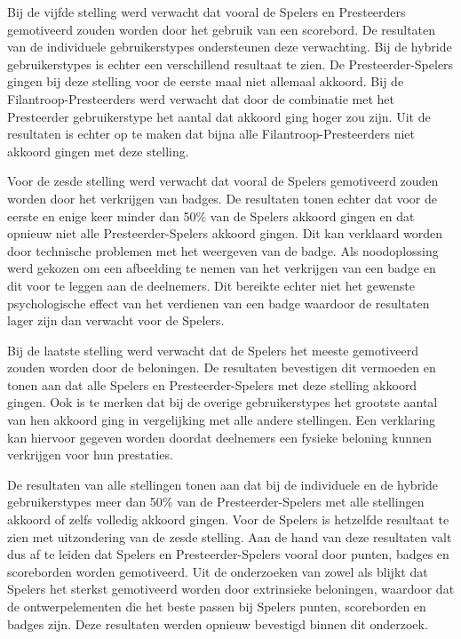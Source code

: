Bij de vijfde stelling werd verwacht dat vooral de Spelers en Presteerders gemotiveerd zouden worden door het gebruik van een scorebord. De resultaten van de individuele gebruikerstypes ondersteunen deze verwachting. Bij de hybride gebruikerstypes is echter een verschillend resultaat te zien.  De Presteerder-Spelers gingen bij deze stelling voor de eerste maal niet allemaal akkoord. Bij de Filantroop-Presteerders werd verwacht dat door de combinatie met het Presteerder gebruikerstype het aantal dat akkoord ging hoger zou zijn. Uit de resultaten is echter op te maken dat bijna alle Filantroop-Presteerders niet akkoord gingen met deze stelling.

Voor de zesde stelling werd verwacht dat vooral de Spelers gemotiveerd zouden worden door het verkrijgen van badges. De resultaten tonen echter dat voor de eerste en enige keer minder dan 50\% van de Spelers akkoord gingen en dat opnieuw niet alle Presteerder-Spelers akkoord gingen. Dit kan verklaard worden door technische problemen met het weergeven van de badge. Als noodoplossing werd gekozen om een afbeelding te nemen van het verkrijgen van een badge en dit voor te leggen aan de deelnemers. Dit bereikte echter niet het gewenste psychologische effect van het verdienen van een badge waardoor de resultaten lager zijn dan verwacht voor de Spelers.

Bij de laatste stelling werd verwacht dat de Spelers het meeste gemotiveerd zouden worden door de beloningen. De resultaten bevestigen dit vermoeden en tonen aan dat alle Spelers en Presteerder-Spelers met deze stelling akkoord gingen. Ook is te merken dat bij de overige gebruikerstypes het grootste aantal van hen akkoord ging in vergelijking met alle andere stellingen. Een verklaring kan hiervoor gegeven worden doordat deelnemers een fysieke beloning kunnen verkrijgen voor hun prestaties.

De resultaten van alle stellingen tonen aan dat bij de individuele en de hybride gebruikerstypes meer dan 50\% van de Presteerder-Spelers met alle stellingen akkoord of zelfs volledig akkoord gingen. Voor de Spelers is hetzelfde resultaat te zien met uitzondering van de zesde stelling. Aan de hand van deze resultaten valt dus af te leiden dat Spelers en Presteerder-Spelers vooral door punten, badges en scoreborden worden gemotiveerd. Uit de onderzoeken van zowel \textcite{Tondello2016} als \textcite{Carreno2018} blijkt dat Spelers het sterkst gemotiveerd worden door extrinsieke beloningen, waardoor dat de ontwerpelementen die het beste passen bij Spelers punten, scoreborden en badges zijn. Deze resultaten werden opnieuw bevestigd binnen dit onderzoek.
    
